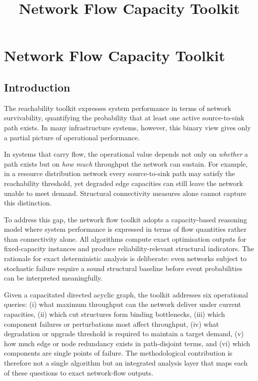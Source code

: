 \documentclass[12pt]{report}
\title{Network Flow Capacity Toolkit}
\author{}
\date{}
\begin{document}
\maketitle

\chapter{Network Flow Capacity Toolkit}

\section{Introduction}
The reachability toolkit expresses system performance in terms of network survivability, quantifying the probability that at least one active source-to-sink path exists. In many infrastructure systems, however, this binary view gives only a partial picture of operational performance.

In systems that carry flow, the operational value depends not only on \emph{whether} a path exists but on \emph{how much} throughput the network can sustain. For example, in a resource distribution network every source-to-sink path may satisfy the reachability threshold, yet degraded edge capacities can still leave the network unable to meet demand. Structural connectivity measures alone cannot capture this distinction.

To address this gap, the network flow toolkit adopts a capacity-based reasoning model where system performance is expressed in terms of flow quantities rather than connectivity alone. All algorithms compute exact optimisation outputs for fixed-capacity instances and produce reliability-relevant structural indicators. The rationale for exact deterministic analysis is deliberate: even networks subject to stochastic failure require a sound structural baseline before event probabilities can be interpreted meaningfully.

Given a capacitated directed acyclic graph, the toolkit addresses six operational queries: (i) what maximum throughput can the network deliver under current capacities, (ii) which cut structures form binding bottlenecks, (iii) which component failures or perturbations most affect throughput, (iv) what degradation or upgrade threshold is required to maintain a target demand, (v) how much edge or node redundancy exists in path-disjoint terms, and (vi) which components are single points of failure. The methodological contribution is therefore not a single algorithm but an integrated analysis layer that maps each of these questions to exact network-flow outputs.
\end{document}
